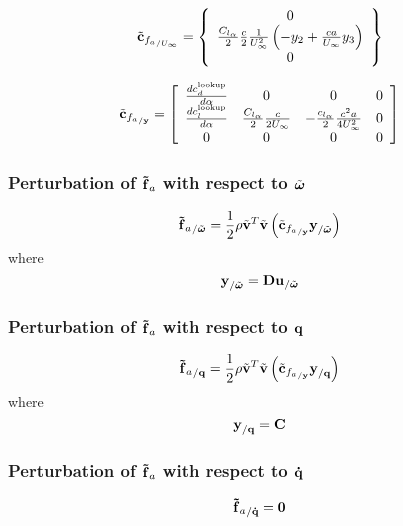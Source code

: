 \begin{equation}
\tilde{\bm{\mathbf{c}}}_{{f_{a}}_{/U_{\infty}}} = \left\{
	\begin{array}{c}
		0 \\
		\frac{C_{l_{\alpha}}}{2} \frac{c}{2} \frac{1}{U_\infty^2} 
		\left(  -y_2 + \frac{c a}{U_\infty} y_3 \right) \\
		0
	\end{array} \right\}
\end{equation}

\begin{equation}
\tilde{\bm{\mathbf{c}}}_{{f_{a}}_{/\bm{\mathbf{y}}}} = \left[
	\begin{array}{cccc}
		\frac{ d c_d^{\text{lookup}}}{d \alpha} & 0 & 0 & 0 \\
		\frac{ d c_l^{\text{lookup}}}{d \alpha} & \frac{C_{l_{\alpha}}}{2} \frac{c}{2 U_\infty}&
			-\frac{c_{l_{\alpha}}}{2} \frac{c^2 a}{4 U_\infty^2} & 0 \\
		0 & 0 & 0 & 0
	\end{array} \right]
\end{equation}

\subsubsection{Perturbation of $\bm{\mathbf{\tilde{f}}}_a$ with respect to $\tilde{\bm{\mathbf{\omega}}}$}
\begin{equation}
{\bm{\mathbf{\tilde{f}}}_a}_{/\tilde{\bm{\mathbf{\omega}}}} = 
	\frac{1}{2} \rho \tilde{\bm{\mathbf{v}}}^T \tilde{\bm{\mathbf{v}}} 
	\left(  \tilde{\bm{\mathbf{c}}}_{{f_{a}}_{/\bm{\mathbf{y}}}} \bm{\mathbf{y}}_{/\tilde{\bm{\mathbf{\omega}}}}  \right) 
\end{equation}
where
\begin{equation}
\bm{\mathbf{y}}_{/\tilde{\bm{\mathbf{\omega}}}} = 
	\bm{\mathbf{D}} \bm{\mathbf{u}}_{/\tilde{\bm{\mathbf{\omega}}}}
\end{equation}
\subsubsection{Perturbation of $\bm{\mathbf{\tilde{f}}}_a$ with respect to $\bm{\mathbf{q}}$}
\begin{equation}
{\bm{\mathbf{\tilde{f}}}_a}_{/\bm{\mathbf{q}}} = 
	\frac{1}{2} \rho \tilde{\bm{\mathbf{v}}}^T \tilde{\bm{\mathbf{v}}} 
	\left(  \tilde{\bm{\mathbf{c}}}_{{f_{a}}_{/\bm{\mathbf{y}}}} \bm{\mathbf{y}}_{/\bm{\mathbf{q}}}  \right) 
\end{equation}
where
\begin{equation}
\bm{\mathbf{y}}_{/\bm{\mathbf{q}}} = \bm{\mathbf{C}} 
\end{equation}

\subsubsection{Perturbation of $\bm{\mathbf{\tilde{f}}}_a$ with respect to $\bm{\mathbf{\dot{q}}}$}
\begin{equation}
{\bm{\mathbf{\tilde{f}}}_a}_{/\bm{\mathbf{\dot{q}}}} = \bm{\mathbf{0}}
\end{equation}

